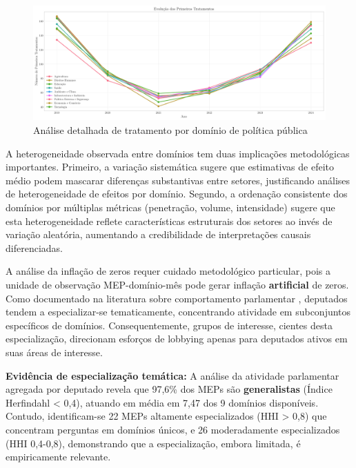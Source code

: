 \begin{figure}[htbp]
    \centering
    \includegraphics[width=\textwidth]{figures/fig7_domain_treatment_analysis.pdf}
    \caption{Análise detalhada de tratamento por domínio de política pública}
    \label{fig:domain_treatment}
\end{figure}


A heterogeneidade observada entre domínios tem duas implicações metodológicas importantes. Primeiro, a variação sistemática sugere que estimativas de efeito médio podem mascarar diferenças substantivas entre setores, justificando análises de heterogeneidade de efeitos por domínio. Segundo, a ordenação consistente dos domínios por múltiplas métricas (penetração, volume, intensidade) sugere que esta heterogeneidade reflete características estruturais dos setores ao invés de variação aleatória, aumentando a credibilidade de interpretações causais diferenciadas.


A análise da inflação de zeros requer cuidado metodológico particular, pois a unidade de observação MEP-domínio-mês pode gerar inflação \textbf{artificial} de zeros. Como documentado na literatura sobre comportamento parlamentar \cite{example}, deputados tendem a especializar-se tematicamente, concentrando atividade em subconjuntos específicos de domínios. Consequentemente, grupos de interesse, cientes desta especialização, direcionam esforços de lobbying apenas para deputados ativos em suas áreas de interesse.

\textbf{Evidência de especialização temática:} A análise da atividade parlamentar agregada por deputado revela que 97,6\% dos MEPs são \textbf{generalistas} (Índice Herfindahl < 0,4), atuando em média em 7,47 dos 9 domínios disponíveis. Contudo, identificam-se 22 MEPs altamente especializados (HHI > 0,8) que concentram perguntas em domínios únicos, e 26 moderadamente especializados (HHI 0,4-0,8), demonstrando que a especialização, embora limitada, é empiricamente relevante.

